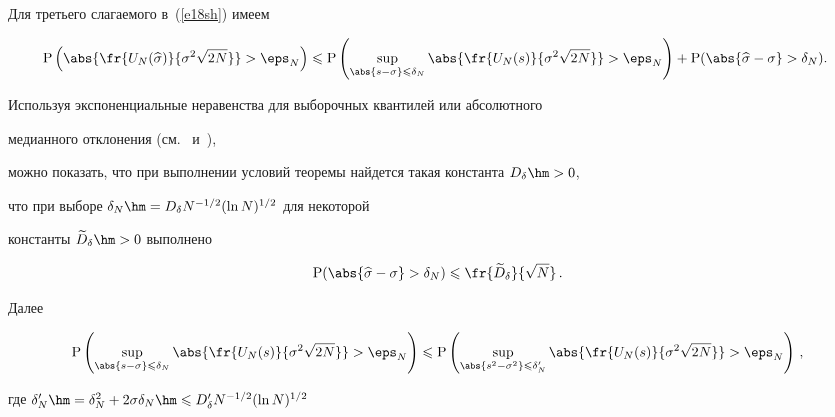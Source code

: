 Для третьего слагаемого в~(\ref{e18sh}) имеем

\begin{equation}

\hspace*{-2mm}\mathrm{P}\left(\abs{\fr{U_N(\widehat{\sigma})}{\sigma^2\sqrt{2N}}}>\eps_N\right)\leqslant

\mathrm{P}\left(\sup\limits_{\abs{s-\sigma}\leqslant\delta_N}\abs{\fr{U_N(s)}{\sigma^2\sqrt{2N}}}>

\eps_N\right)+\mathrm{P}(\abs{\widehat{\sigma}-\sigma}>\delta_N).\!\label{e21sh}

\end{equation}

Используя экспоненциальные неравенства для выборочных квантилей или абсолютного 

медианного отклонения (см.~\cite{14sh} и~\cite{18sh}), 

можно показать, что при выполнении условий теоремы найдется такая константа $D_\delta\hm>0$, 

что при выборе $\delta_N\hm=D_\delta N^{-1/2}(\ln N)^{1/2}$ для некоторой 

константы $\widetilde{D}_\delta\hm>0$ выполнено

\begin{equation}

\mathrm{P}(\abs{\widehat{\sigma}-\sigma}>\delta_N)\leqslant

\fr{\widetilde{D}_\delta}{\sqrt{N}}\,.\label{e22sh}

\end{equation}


Далее

\begin{equation}

\mathrm{P}\left(\sup\limits_{\abs{s-\sigma}\leqslant\delta_N}\abs{\fr{U_N(s)}

{\sigma^2\sqrt{2N}}}>\eps_N\right)\leqslant\mathrm{P}\left(

\sup\limits_{\abs{s^2-\sigma^2}\leqslant\delta'_N}\abs{\fr{U_N(s)}{\sigma^2\sqrt{2N}}}>

\eps_N\right)\,,\label{e23sh}

\end{equation}

где $\delta'_N\hm=\delta^2_N+2\sigma\delta_N\hm\leqslant D'_\delta N^{-1/2}(\ln N)^{1/2}$ 

